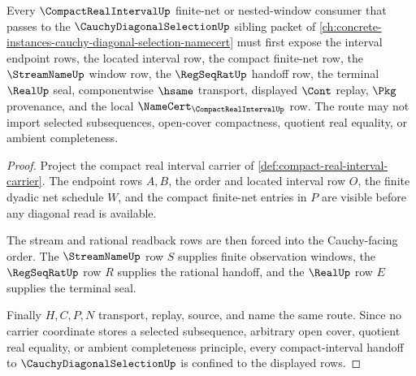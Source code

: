 \begin{theorem}
\label{thm:compact-real-interval-cauchy-diagonal-dependency}
Every $\CompactRealIntervalUp$ finite-net or nested-window consumer that passes to the $\CauchyDiagonalSelectionUp$ sibling packet of \autoref{ch:concrete-instances-cauchy-diagonal-selection-namecert} must first expose the interval endpoint rows, the located interval row, the compact finite-net row, the $\StreamNameUp$ window row, the $\RegSeqRatUp$ handoff row, the terminal $\RealUp$ seal, componentwise $\hsame$ transport, displayed $\Cont$ replay, $\Pkg$ provenance, and the local $\NameCert_{\CompactRealIntervalUp}$ row. The route may not import selected subsequences, open-cover compactness, quotient real equality, or ambient completeness.
\end{theorem}
\begin{proof}
Project the compact real interval carrier of \autoref{def:compact-real-interval-carrier}. The endpoint rows $A,B$, the order and located interval row $O$, the finite dyadic net schedule $W$, and the compact finite-net entries in $P$ are visible before any diagonal read is available.

The stream and rational readback rows are then forced into the Cauchy-facing order. The $\StreamNameUp$ row $S$ supplies finite observation windows, the $\RegSeqRatUp$ row $R$ supplies the rational handoff, and the $\RealUp$ row $E$ supplies the terminal seal.

Finally $H,C,P,N$ transport, replay, source, and name the same route. Since no carrier coordinate stores a selected subsequence, arbitrary open cover, quotient real equality, or ambient completeness principle, every compact-interval handoff to $\CauchyDiagonalSelectionUp$ is confined to the displayed rows.
\end{proof}
